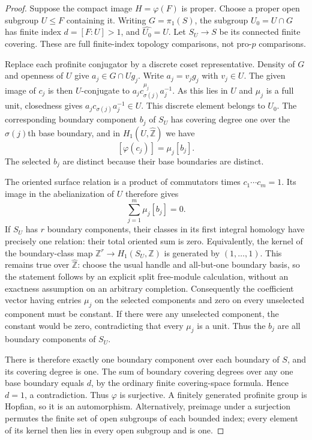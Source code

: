 \documentclass[11pt]{article}
\begin{document}
\begin{proof}
Suppose the compact image $H=\varphi(F)$ is proper. Choose a proper open subgroup $U\leq F$ containing it. Writing $G=\pi_1(S)$, the subgroup $U_0=U\cap G$ has finite index $d=[F:U]>1$, and $\widehat{U_0}=U$. Let $S_U\to S$ be its connected finite covering. These are full finite-index topology comparisons, not pro-$p$ comparisons.

Replace each profinite conjugator by a discrete coset representative. Density of $G$ and openness of $U$ give $a_j\in G\cap Ug_j$. Write $a_j=v_jg_j$ with $v_j\in U$. The given image of $c_j$ is then $U$-conjugate to $a_j c_{\sigma(j)}^{\mu_j}a_j^{-1}$. As this lies in $U$ and $\mu_j$ is a full unit, closedness gives $a_j c_{\sigma(j)}a_j^{-1}\in U$. This discrete element belongs to $U_0$. The corresponding boundary component $b_j$ of $S_U$ has covering degree one over the $\sigma(j)$th base boundary, and in $H_1(U,\widehat{\mathbb Z})$ we have
\[
                       [\varphi(c_j)]=\mu_j[b_j].
\]
The selected $b_j$ are distinct because their base boundaries are distinct.

The oriented surface relation is a product of commutators times $c_1\cdots c_m=1$. Its image in the abelianization of $U$ therefore gives
\[
                         \sum_{j=1}^m\mu_j[b_j]=0.
\]
If $S_U$ has $r$ boundary components, their classes in its first integral homology have precisely one relation: their total oriented sum is zero. Equivalently, the kernel of the boundary-class map $\mathbb Z^r\to H_1(S_U,\mathbb Z)$ is generated by $(1,\ldots,1)$. This remains true over $\widehat{\mathbb Z}$: choose the usual handle and all-but-one boundary basis, so the statement follows by an explicit split free-module calculation, without an exactness assumption on an arbitrary completion. Consequently the coefficient vector having entries $\mu_j$ on the selected components and zero on every unselected component must be constant. If there were any unselected component, the constant would be zero, contradicting that every $\mu_j$ is a unit. Thus the $b_j$ are all boundary components of $S_U$.

There is therefore exactly one boundary component over each boundary of $S$, and its covering degree is one. The sum of boundary covering degrees over any one base boundary equals $d$, by the ordinary finite covering-space formula. Hence $d=1$, a contradiction. Thus $\varphi$ is surjective. A finitely generated profinite group is Hopfian, so it is an automorphism. Alternatively, preimage under a surjection permutes the finite set of open subgroups of each bounded index; every element of its kernel then lies in every open subgroup and is one.


\end{proof}
\end{document}
